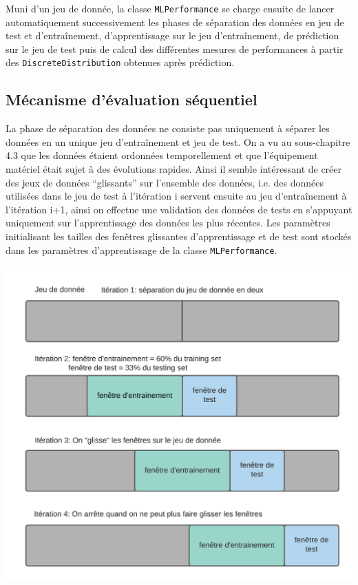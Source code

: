 Muni d’un jeu de donnée, la classe \texttt{MLPerformance} se charge ensuite de lancer automatiquement successivement les phases de séparation des données en jeu de test et d'entraînement,  d’apprentissage sur le jeu d’entraînement, de prédiction sur le jeu de test puis de calcul des différentes mesures de performances à partir des \texttt{DiscreteDistribution} obtenues après prédiction.

\subsection{Mécanisme d’évaluation séquentiel}

La phase de séparation des données ne consiste pas uniquement à séparer les données en un unique jeu d'entraînement et jeu de test. On a vu au sous-chapitre 4.3 que les données étaient ordonnées temporellement et que l’équipement matériel était sujet à des évolutions rapides. Ainsi il semble intéressant de créer des jeux de données “glissants” sur l’ensemble des données, i.e. des données utilisées dans le jeu de test à l’itération i servent ensuite au jeu d'entraînement à l’itération i+1, ainsi on effectue une validation des données de tests en s’appuyant uniquement sur l’apprentissage des données les plus récentes. Les paramètres initialisant les tailles des fenêtres glissantes d’apprentissage et de test sont stockés dans les paramètres d’apprentissage de la classe \texttt{MLPerformance}.

\begin{center}
\includegraphics[scale=0.25]{figures/Sliding_split.png}
\label{fig9}
\end{center}

